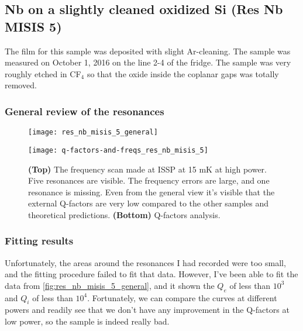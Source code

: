 \documentclass[12pt]{article}
\numberwithin{equation}{section}
\numberwithin{figure}{section}
\begin{document}
\subsection{Nb on a slightly cleaned oxidized Si (Res Nb MISIS 5)}

The film for this sample was deposited with slight Ar-cleaning. The sample was measured on October 1, 2016 on the line 2-4 of the fridge. The sample was very roughly etched in CF$_4$ so that the oxide inside the coplanar gaps was totally removed.

\subsubsection{General review of the resonances}

\begin{figure}[h!]
\centering
\texttt{[image: res\_nb\_misis\_5\_general]}

\vspace{0.5cm}
\texttt{[image: q-factors-and-freqs\_res\_nb\_misis\_5]}

\caption{\textbf{(Top)} The frequency scan made at ISSP at 15 mK at high power. Five resonances are visible. The frequency errors are large, and one resonance is missing. Even from the general view it's visible that the external Q-factors are very low compared to the other samples and theoretical predictions. \textbf{(Bottom)} Q-factors analysis.}
\label{fig:res_nb_misis_5_general}
\end{figure}

\subsubsection{Fitting results}

Unfortunately, the areas around the resonances I had recorded were too small, and the fitting procedure failed to fit that data. However, I've been able to fit the data from \autoref{fig:res_nb_misis_5_general}, and it shown the $Q_e$ of less than $10^3$ and $Q_i$ of less than $10^4$. Fortunately, we can compare the curves at different powers and readily see that we don't have any improvement in the Q-factors at low power, so the sample is indeed really bad.

\newpage
\end{document}
